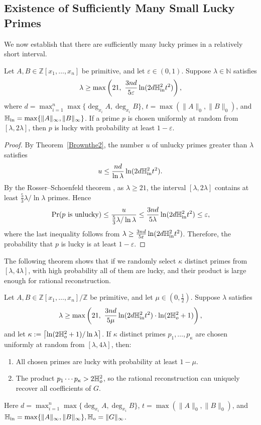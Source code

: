 \documentclass{article}
\numberwithin{equation}{section}
\begin{document}
\subsection*{Existence of Sufficiently Many Small Lucky Primes}

We now establish that there are sufficiently many lucky primes in a relatively short interval.

\begin{lemma}\label{lem:lucky-prime-any-eps}
Let $A,B\in\mathbb{Z}[x_1,\dots,x_n]$ be primitive, and let $\varepsilon\in(0,1)$. Suppose $\lambda\in\mathbb{N}$ satisfies
\[
\lambda \ge \max\left(21,\ \frac{3nd}{5\varepsilon}\ln(2d \Hi^2 t^2)\right),
\]
where $d=\max_{i=1}^n\max\{\deg_{x_i} A,\deg_{x_i} B\}$, $t=\max(\|A\|_0,\|B\|_0)$, and $\mathbb{H}_{\rm in}=\max\{\|A\|_\infty,\|B\|_\infty\}$. If a prime $p$ is chosen uniformly at random from $[\lambda,2\lambda]$, then $p$ is lucky with probability at least $1-\varepsilon$.
\end{lemma}

\begin{proof}
By Theorem~\ref{Brownthe2}, the number $u$ of unlucky primes greater than $\lambda$ satisfies
\[
u \le \frac{nd}{\ln\lambda}\ln(2d \mathbb{H}_{\rm in}^2 t^2).
\]
By the Rosser--Schoenfeld theorem \cite[Cor.3]{1962Approximate}, as $\lambda\ge 21$, the interval $[\lambda,2\lambda]$ contains at least $\frac{5}{3}\lambda/\ln\lambda$ primes. Hence
\[
\Pr(p\text{ is unlucky})
\le \frac{u}{\frac{5}{3}\lambda/\ln\lambda}
\le \frac{3nd}{5\lambda}\ln(2d \mathbb{H}_{\rm in}^2 t^2)
\le \varepsilon,
\]
where the last inequality follows from $\lambda \ge \frac{3nd}{5\varepsilon}\ln(2d \mathbb{H}_{\rm in}^2 t^2)$. Therefore, the probability that $p$ is lucky is at least $1-\varepsilon$.
\end{proof}



The following theorem shows that if we randomly select $\kappa$ distinct primes from $[\lambda, 4\lambda]$, with high probability all of them are lucky, and their product is large enough for rational reconstruction.

\begin{theorem}\label{thm:lucky-primes-crt}
Let $A,B\in\mathbb{Z}[x_1,\dots,x_n]/\mathbb{Z}$ be primitive, and let $\mu \in (0,\frac{1}{2})$. Suppose $\lambda$ satisfies
\[
\lambda \ge \max\left(
    21,\ 
    \frac{3nd}{5\mu} \ln(2d \Hi^2 t^2)\cdot \ln(2\Ho^2+1) 
\right),
\]
and let $\kappa: = \left\lceil \ln(2\mathbb{H}_{o}^2+1) / \ln \lambda \right\rceil$. If $\kappa$ distinct primes $p_1,\dots,p_\kappa$ are chosen uniformly at random from $[\lambda, 4\lambda]$, then:

\begin{enumerate}
    \item All chosen primes are lucky with probability at least $1 - \mu$.
    \item The product $p_1 \cdots p_\kappa > 2\mathbb{H}_{o}^2$, so the rational reconstruction can uniquely recover all coefficients of $G$.
\end{enumerate}
Here $d=\max_{i=1}^n\max\{\deg_{x_i} A,\deg_{x_i} B\}$, $t=\max(\|A\|_0,\|B\|_0)$, and $\mathbb{H}_{\rm in}=\max\{\|A\|_\infty,\|B\|_\infty\},\mathbb{H}_{o}=\|G\|_\infty$.

\end{theorem}
\end{document}

